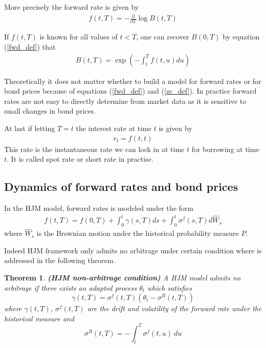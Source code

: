 \documentclass[10pt]{article}
\theoremstyle{plain}
\newtheorem{theorem}{Theorem}[section]
\numberwithin{equation}{section}
\numberwithin{table}{section}
\begin{document}
More precisely the forward rate is given by
\begin{eqnarray}
f(t,T)=-\frac{\partial }{\partial T}\log B(t,T)  
\label{fwd_def}
\end{eqnarray}

If $f(t,T)$ is known for all values of $t<T$, one can recover $B(0,T)$ by
equation (\ref{fwd_def}) that
\begin{eqnarray}
    B(t,T) = \exp{\left(-\int_{t}^T f(t,u) du \right)}  \label{zc_def}
\end{eqnarray}

Theoretically it does not matter whether to build a model for forward rates
or for bond prices because of equations (\ref{fwd_def}) and (\ref{zc_def}).
In practice forward rates are not easy to directly determine from market
data as it is sensitive to small changes in bond prices.

At last if letting $T=t$ the interest rate at time $t$ is given by
\begin{eqnarray}
r_{t} = f(t,t)  
\label{r_t_def}
\end{eqnarray}
This rate is the instantaneous rate we can lock in at time $t$ for borrowing
at time $t$. It is called spot rate or short rate in practise.


\subsection{Dynamics of forward rates and bond prices}

In the HJM model, forward rates is modeled under the form
\begin{eqnarray}
f(t,T)=f(0,T) + \int_{0}^{t}\gamma(s,T) ds + \int_{0}^{t}\sigma^f(s,T) d
\hat{W}_{s}  \label{HJM_f_def}
\end{eqnarray}
where $\hat{W}_{s}$ is the Brownian motion under the historical probability
measure $P$.

Indeed HJM framework only admits no arbitrage under certain condition where is addressed in
the following theorem.

\begin{theorem}
    \emph{\textbf{(HJM non-arbitrage condition)}} A HJM model
    admits no arbitrage if there exists an adapted process $\theta_{t}$ which
    satisfies
    \[
        \gamma(t,T) = \sigma^f(t,T)\left( \theta_{t} -  \sigma^B(t,T) \right)
    \]
    where $\gamma(t,T)$, $\sigma^f(t,T)$ are the drift and volatility of the
    forward rate under the historical measure and
    \[
        \sigma^B(t,T)= - \int_{t}^T\sigma^f(t,u)\ du
    \]
    \label{thm_hjm_noarb}
\end{theorem}
\end{document}
